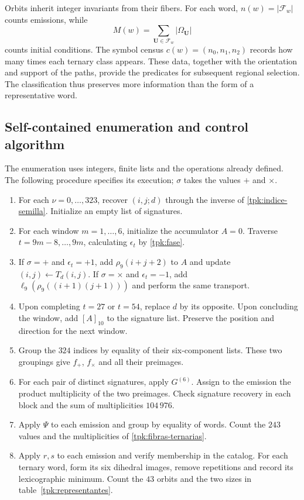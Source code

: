 Orbits inherit integer invariants from their fibers. For each word,
\(n(w)=|\mathcal F_w|\) counts emissions, while
\[
 M(w)=\sum_{\mathbf U\in\mathcal F_w}|\Omega_{\mathbf U}|
\]
counts initial conditions. The symbol census
\(c(w)=(n_0,n_1,n_2)\) records how many times each ternary class appears.
These data, together with the orientation and support of the paths,
provide the predicates for subsequent regional selection. The
classification thus preserves more information than the form of a representative
word.

\subsection{Self-contained enumeration and control algorithm}
\label{tpk:algoritmo}

The enumeration uses integers, finite lists and the operations already defined.
The following procedure specifies its execution; \(\sigma\) takes the values
\(+\) and \(\times\).

\begin{enumerate}
\item For each \(\nu=0,\ldots,323\), recover \((i,j;d)\) through
the inverse of \eqref{tpk:indice-semilla}. Initialize an empty list of signatures.
\item For each window \(m=1,\ldots,6\), initialize the accumulator \(A=0\).
Traverse \(t=9m-8,\ldots,9m\), calculating \(\epsilon_t\) by
\eqref{tpk:fase}.
\item If \(\sigma=+\) and \(\epsilon_t=+1\), add
\(\rho_9(i+j+2)\) to \(A\) and update
\((i,j)\leftarrow T_d(i,j)\). If \(\sigma=\times\) and
\(\epsilon_t=-1\), add
\(\ell_9(\rho_9((i+1)(j+1)))\) and perform the same transport.
\item Upon completing \(t=27\) or \(t=54\), replace \(d\) by its opposite.
Upon concluding the window, add \([A]_{10}\) to the signature list.
Preserve the position and direction for the next window.
\item Group the \(324\) indices by equality of their six-component
lists. These two groupings give \(f_+\), \(f_\times\) and all
their preimages.
\item For each pair of distinct signatures, apply \(G^{(6)}\).
Assign to the emission the product multiplicity of the two preimages.
Check signature recovery in each block and the sum of
multiplicities \(104\,976\).
\item Apply \(\Psi\) to each emission and group by equality of words.
Count the \(243\) values and the multiplicities of
\eqref{tpk:fibras-ternarias}.
\item Apply \(r,s\) to each emission and verify membership in the catalog.
For each ternary word, form its six dihedral images, remove
repetitions and record its lexicographic minimum. Count the \(43\)
orbits and the two sizes in table~\ref{tpk:representantes}.
\end{enumerate}

